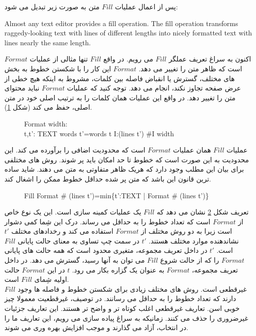 پس از اعمال عملیات $Fill$ متن به صورت زیر تبدیل می شود:

\begin{LTR}
Almost any text editor provides a fill
operation. The fill operation transforms raggedy-looking text
with lines of
different lengths into nicely formatted text with lines
nearly the same length.
\end{LTR}
اکنون به سراغ تعریف عملگر $Fill$ می رویم. در واقع $Fill$ تنها مثالی از عملیات $Format$ است که ظاهر متن را تغییر می دهد. $Format$ این کار را با شکستن خطوط به بخش های مختلف، گسترش یا انقباض فاصله بین کلمات، مشروط به اینکه هیچ خطی از عرض صفحه تجاوز نکند، انجام می دهد. توجه کنید که عملیات $Format$ نباید محتوای متن را تغییر دهد. در واقع این عملیات همان کلمات را به ترتیب اصلی خود در متن اصلی، حفظ می کند (شکل \ref{format}).
\\
\begin{figure}
\centering
\begin{schema}{Format}
width: \\
t,t': TEXT
\ST
words \enspace t'=words \enspace t
\forall I:(lines \enspace t') \bullet \#I \leqslant width
\end{schema}
\caption{}
\label{format}
\end{figure}
عملیات $Fill$ همان عملیات $Format$ است که محدودیت اضافی را برآورده می کند. این محدودیت به این صورت است که خطوط تا حد امکان باید پر شوند. روش های مختلفی برای بیان این مطلب وجود دارد که هریک ظاهر متفاوتی به متن می دهند. شاید ساده ترین قانون این باشد که متن پر شده حداقل خطوط ممکن را اشغال کند. 
\begin{figure}
\centering
\begin{schema}{Fill}
Format
\ST
\# (lines \enspace t')=min\{t':TEXT | Format \bullet \# (lines \enspace t')\}
\end{schema}
\caption{}
\label{fill}
\end{figure}
تعریف شکل 
\ref{fill}
نشان می دهد که $Fill$ یک عملیات کمینه سازی است. این یک نوع خاص از $Format$ است که تعداد خطوط را به حداقل می رساند. درک این شِما کمی دشوار است زیرا به دو روش مختلف از $Format$ استفاده می کند و رخدادهای مختلف $t'$ نشاندهنده موارد مختلف هستند. $t'$ در سمت چپ تساوی به معنای حالت پایانی $Fill$ است. 
$t'$
در داخل تعریف مجموعه، متغیری محدود است که همه حالت های پایانی $Format$ را که از حالت شروع $Fill$ می توان به آنها رسید، گسترش می دهد. در داخل تعریف مجموعه، $Format$ به عنوان یک گزاره بکار می رود. 
$t$
در این $Format$ حالت اولیه شِمای $Fill$ است. 
\\
$Fill$
 غیرقطعی است. روش های مختلف زیادی برای شکستن خطوط و فاصله ها وجود دارند که تعداد خطوط را به حداقل می رسانند. در توصیف، غیرقطعیت معمولا چیز خوبی اسن. تعاریف غیرقطعی اغلب کوتاه تر و واضح تر هستند. این تعاریف جزئیات غیرضروری را حذف می کنند. زمانیکه به سراغ پیاده سازی می رویم، این تعاریف ما را در انتخاب، آزاد می گذارند و موجب افزایش بهره وری می شوند. 
 
